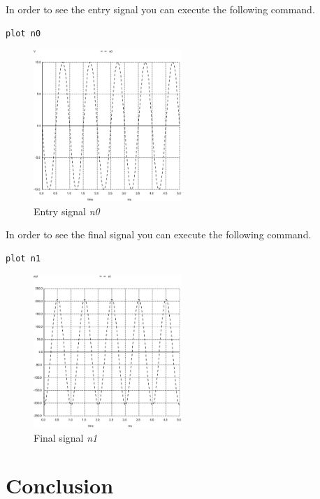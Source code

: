 \documentclass{article}
\begin{document}
In order to see the entry signal you can execute the following command. \break

\begin{lstlisting}
plot n0
\end{lstlisting} 

\begin{figure}[H]
\centering
\includegraphics[width=0.5\textwidth, height=0.5\textwidth, angle =0]{012}
\caption{Entry signal \textit{n0}}
\end{figure}

In order to see the final signal you can execute the following command. \break

\begin{lstlisting}
plot n1
\end{lstlisting} 

\begin{figure}[H]
\centering
\includegraphics[width=0.5\textwidth, height=0.5\textwidth, angle =0]{013}
\caption{Final signal \textit{n1}}
\end{figure}

\section{Conclusion}
\end{document}

